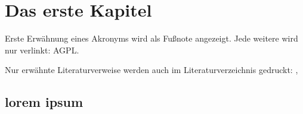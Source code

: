 
\chapter{Das erste Kapitel}
Erste Erwähnung eines Akronyms wird als Fußnote angezeigt. Jede weitere wird
nur verlinkt: \acf{AGPL}. \cite{fsf:2007}

Nur erwähnte Literaturverweise werden auch im Literaturverzeichnis gedruckt:
\cite{baumgartner:2002}, \cite{dreyfus:1980}

\lipsum[1]

\section{lorem ipsum}